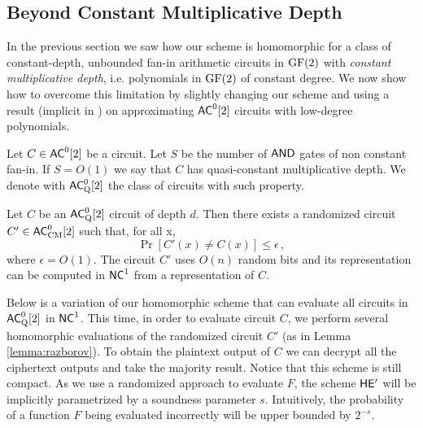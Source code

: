 \subsection{Beyond Constant Multiplicative Depth}
\label{sec:beyond-cm}

In the previous section we saw how our scheme is homomorphic for a class of constant-depth, unbounded fan-in arithmetic circuits in $\text{GF}(2)$ with \textit{constant multiplicative depth}, i.e. polynomials in $\text{GF}(2)$ of constant degree. We now show how to overcome this limitation by slightly changing our scheme and using a result (implicit in \cite{razborov1987lower}) on approximating ${\mathsf{AC}}^0[2]$ circuits with low-degree polynomials.

\begin{definition}
\label{def:quasi-constant}
Let $C \in {\ensuremath{\mathsf{AC}}}^0[2]$ be a circuit. Let $S$ be the number of $\mathsf{AND}$ gates of non constant fan-in. If $S = O(1)$ we say that $C$ has quasi-constant multiplicative depth. We denote with ${\mathsf{AC}}^0_{\text{Q}}[2]$ the class of circuits with such property.
\end{definition}

\begin{lemma}
\label{lemma:razborov}
Let $C$ be an ${\mathsf{AC}}^0_{\text{Q}}[2]$ circuit of depth $d$. Then there exists a randomized circuit $C' \in {\ensuremath{\mathsf{AC}}}^0_{\text{CM}}[2]$ such that, for all x,
\[
\Pr[C'(x) \not = C(x)] \leq \epsilon \, ,
\]
where $\epsilon = O(1)$. The circuit $C'$ uses $O(n)$ random bits and its representation can be computed in ${\mathsf{NC}}^1$ from a representation of $C$.
\end{lemma}

Below is a variation of our homomorphic scheme that can evaluate all circuits in ${\mathsf{AC}}^0_{\text{Q}}[2]$ in ${\mathsf{NC}}^1$. This time, in order to evaluate circuit $C$, we perform several homomorphic evaluations of the randomized circuit $C'$ (as in Lemma \ref{lemma:razborov}). To obtain the plaintext output of $C$ we can decrypt all the ciphertext outputs and take the majority result. Notice that this scheme is still compact.
As we use a randomized approach to evaluate $F$, the scheme $\mathsf{HE'}$ will be implicitly parametrized by a soundness parameter $s$. Intuitively, the probability of a function $F$ being evaluated incorrectly will be upper bounded by $2^{-s}$.




